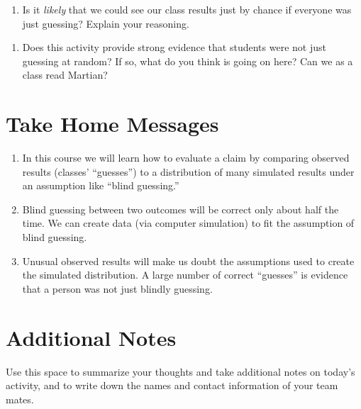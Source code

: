 \documentclass[
]{report}
\providecommand{\tightlist}{%
  \setlength{\itemsep}{0pt}\setlength{\parskip}{0pt}}
\begin{document}
\vspace{1in}

\begin{enumerate}
\def\labelenumi{\arabic{enumi}.}
\setcounter{enumi}{16}
\tightlist
\item
  Is it \emph{likely} that we could see our class results just by chance if everyone was just guessing? Explain your reasoning.
\end{enumerate}

\vspace{1in}

\begin{enumerate}
\def\labelenumi{\arabic{enumi}.}
\setcounter{enumi}{17}
\tightlist
\item
  Does this activity provide strong evidence that students were not just guessing at random? If so, what do you think is going on here? Can we as a class read Martian?
\end{enumerate}

\vspace{1in}

\hypertarget{take-home-messages}{%
\section{Take Home Messages}\label{take-home-messages}}

\begin{enumerate}
\def\labelenumi{\arabic{enumi}.}
\item
  In this course we will learn how to evaluate a claim by comparing observed results (classes' ``guesses'') to a distribution of many simulated results under an assumption like ``blind guessing.''
\item
  Blind guessing between two outcomes will be correct only about half the time. We can create data (via computer simulation) to fit the assumption of blind guessing.
\item
  Unusual observed results will make us doubt the assumptions used to create the simulated distribution. A large number of correct ``guesses'' is evidence that a person was not just blindly guessing.
\end{enumerate}

\hypertarget{additional-notes}{%
\section{Additional Notes}\label{additional-notes}}

Use this space to summarize your thoughts and take additional notes on today's activity, and to write down the names and contact information of your team mates.
\end{document}
